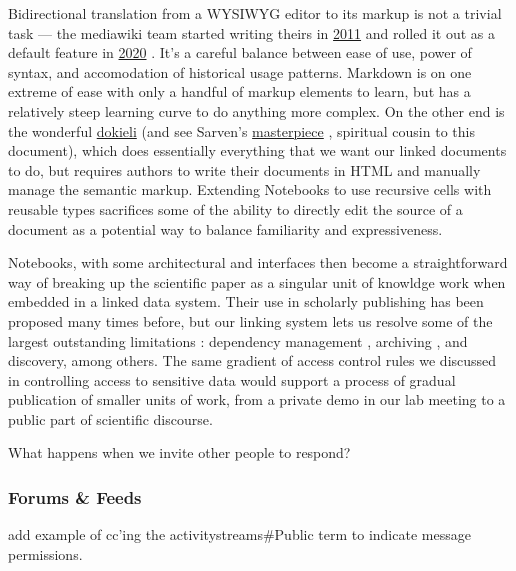 Bidirectional translation from a WYSIWYG editor to its markup is not a
trivial task --- the mediawiki team started writing theirs in
\href{https://www.mediawiki.org/wiki/VisualEditor}{2011} and rolled it
out as a default feature in
\href{https://en.wikipedia.org/wiki/MediaWiki_version_history}{2020}
\citep{forresterInventingWeGo2012} . It's a careful balance
between ease of use, power of syntax, and accomodation of historical
usage patterns. Markdown is on one extreme of ease with only a handful
of markup elements to learn, but has a relatively steep learning curve
to do anything more complex. On the other end is the wonderful
\href{https://dokie.li/}{dokieli} \citep{capadisliDecentralisedAuthoringAnnotations2017}  (and see Sarven's
\href{https://csarven.ca/linked-research-decentralised-web}{masterpiece}
\citep{capadisliLinkedResearchDecentralised2019} , spiritual
cousin to this document), which does essentially everything that we want
our linked documents to do, but requires authors to write their
documents in HTML and manually manage the semantic markup. Extending
Notebooks to use recursive cells with reusable types sacrifices some of
the ability to directly edit the source of a document as a potential way
to balance familiarity and expressiveness.

Notebooks, with some architectural and interfaces then become a
straightforward way of breaking up the scientific paper as a singular
unit of knowldge work when embedded in a linked data system. Their use
in scholarly publishing has been proposed many times before, but our
linking system lets us resolve some of the largest outstanding
limitations \citep{chattopadhyayWhatWrongComputational2020} :
dependency management \citep{ruleTenSimpleRules2019} , archiving
\citep{woffordJupyterNotebooksDiscovery2020} , and discovery,
among others. The same gradient of access control rules we discussed in
controlling access to sensitive data would support a process of gradual
publication of smaller units of work, from a private demo in our lab
meeting to a public part of scientific discourse.

What happens when we invite other people to respond?

\hypertarget{forums-feeds}{%
\subsubsection{Forums \& Feeds}\label{forums-feeds}}

add example of cc'ing the activitystreams\#Public term to indicate
message permissions.

